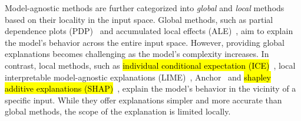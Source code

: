 \documentclass[runningheads]{llncs}
\begin{document}
{Model-agnostic methods are further categorized into
\emph{global} and \emph{local} methods based on their locality in the input space.
Global methods,
such as partial dependence plots (PDP)~\cite{friedman2001greedy}
and accumulated local effects (ALE)~\cite{apley2020visualizing},
aim to explain the model's behavior across the entire input space.
However, providing global explanations becomes challenging
as the model's complexity increases.
In contrast, local methods,
such as \hl{individual conditional expectation (ICE)}~\cite{goldstein2015peeking},
local interpretable model-agnostic explanations
(LIME)~\cite{ribeiro2016why}, Anchor~\cite{ribeiro2018anchors} and
\hl{shapley additive explanations (SHAP)}~\cite{lundberg2017unified},
explain the model's behavior in the vicinity of a specific input.
While they offer explanations simpler and more accurate than global methods,
the scope of the explanation is limited locally.

}
\end{document}
